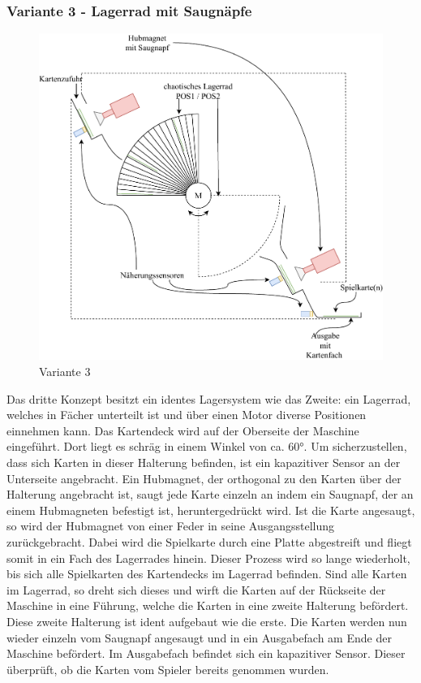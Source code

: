 \subsubsection{Variante 3 - Lagerrad mit Saugnäpfe}

\begin{figure}[H]
    \centering
    \includegraphics[scale=0.9,page=1]{fig/mech/Version3}
    \caption{Variante 3}
\end{figure}

Das dritte Konzept besitzt ein identes Lagersystem wie das Zweite: ein Lagerrad, welches in Fächer unterteilt ist und über einen Motor diverse Positionen einnehmen kann.
Das Kartendeck wird auf der Oberseite der Maschine eingeführt. Dort liegt es schräg in einem Winkel von ca. 60°. Um sicherzustellen, dass sich Karten in dieser Halterung befinden,
ist ein kapazitiver Sensor an der Unterseite angebracht.
Ein Hubmagnet, der orthogonal zu den Karten über der Halterung angebracht ist, saugt jede Karte einzeln an indem ein Saugnapf, der an einem Hubmagneten
befestigt ist, heruntergedrückt wird. Ist die Karte angesaugt, so wird der Hubmagnet von einer Feder in seine Ausgangsstellung zurückgebracht.
Dabei wird die Spielkarte durch eine Platte abgestreift und fliegt somit in ein Fach des
Lagerrades hinein. Dieser Prozess wird so lange wiederholt, bis sich alle Spielkarten des Kartendecks im Lagerrad befinden.
Sind alle Karten im Lagerrad, so dreht sich dieses und wirft die Karten auf der Rückseite der Maschine in eine Führung, welche die Karten in eine zweite Halterung befördert.
Diese zweite Halterung ist ident aufgebaut wie die erste.
Die Karten werden nun wieder einzeln vom Saugnapf angesaugt und in ein Ausgabefach am Ende der Maschine befördert. Im Ausgabefach befindet sich
ein kapazitiver Sensor. Dieser überprüft, ob die Karten vom Spieler bereits genommen wurden.\\

